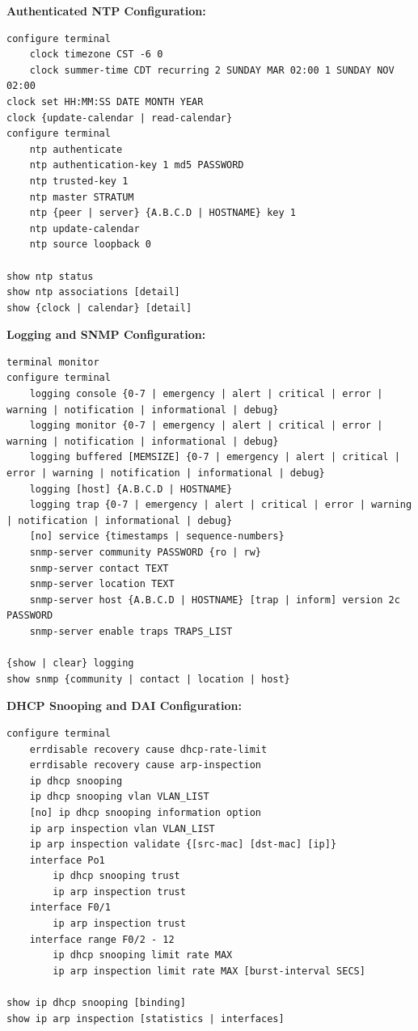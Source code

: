 \documentclass[12pt]{article}
\begin{document}
	\textbf{Authenticated NTP Configuration:}
	\begin{lstlisting}
configure terminal
	clock timezone CST -6 0
	clock summer-time CDT recurring 2 SUNDAY MAR 02:00 1 SUNDAY NOV 02:00
clock set HH:MM:SS DATE MONTH YEAR
clock {update-calendar | read-calendar}
configure terminal
	ntp authenticate
	ntp authentication-key 1 md5 PASSWORD
	ntp trusted-key 1
	ntp master STRATUM
	ntp {peer | server} {A.B.C.D | HOSTNAME} key 1
	ntp update-calendar
	ntp source loopback 0

show ntp status
show ntp associations [detail]
show {clock | calendar} [detail]
	\end{lstlisting}

	\textbf{Logging and SNMP Configuration:}
	\begin{lstlisting}
terminal monitor
configure terminal
	logging console {0-7 | emergency | alert | critical | error | warning | notification | informational | debug}
	logging monitor {0-7 | emergency | alert | critical | error | warning | notification | informational | debug}
	logging buffered [MEMSIZE] {0-7 | emergency | alert | critical | error | warning | notification | informational | debug}
	logging [host] {A.B.C.D | HOSTNAME}
	logging trap {0-7 | emergency | alert | critical | error | warning | notification | informational | debug}
	[no] service {timestamps | sequence-numbers}
	snmp-server community PASSWORD {ro | rw}
	snmp-server contact TEXT
	snmp-server location TEXT
	snmp-server host {A.B.C.D | HOSTNAME} [trap | inform] version 2c PASSWORD
	snmp-server enable traps TRAPS_LIST

{show | clear} logging
show snmp {community | contact | location | host}
	\end{lstlisting}

	\textbf{DHCP Snooping and DAI Configuration:}
	\begin{lstlisting}
configure terminal
	errdisable recovery cause dhcp-rate-limit
	errdisable recovery cause arp-inspection
	ip dhcp snooping
	ip dhcp snooping vlan VLAN_LIST
	[no] ip dhcp snooping information option
	ip arp inspection vlan VLAN_LIST
	ip arp inspection validate {[src-mac] [dst-mac] [ip]}
	interface Po1
		ip dhcp snooping trust
		ip arp inspection trust
	interface F0/1
		ip arp inspection trust
	interface range F0/2 - 12
		ip dhcp snooping limit rate MAX
		ip arp inspection limit rate MAX [burst-interval SECS]

show ip dhcp snooping [binding]
show ip arp inspection [statistics | interfaces]
	\end{lstlisting}
\end{document}

